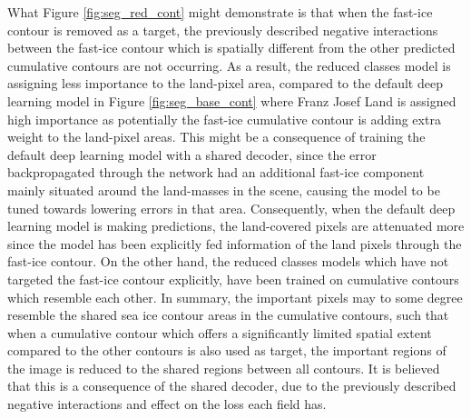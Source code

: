 \documentclass[../main/thesis]{subfiles}
\begin{document}
What Figure \ref{fig:seg_red_cont} might demonstrate is that when the fast-ice contour is removed as a target, the previously described negative interactions between the fast-ice contour which is spatially different from the other predicted cumulative contours are not occurring. As a result, the reduced classes model is assigning less importance to the land-pixel area, compared to the default deep learning model in Figure \ref{fig:seg_base_cont} where Franz Josef Land is assigned high importance as potentially the fast-ice cumulative contour is adding extra weight to the land-pixel areas. This might be a consequence of training the default deep learning model with a shared decoder, since the error backpropagated through the network had an additional fast-ice component mainly situated around the land-masses in the scene, causing the model to be tuned towards lowering errors in that area. Consequently, when the default deep learning model is making predictions, the land-covered pixels are attenuated more since the model has been explicitly fed information of the land pixels through the fast-ice contour. On the other hand, the reduced classes models which have not targeted the fast-ice contour explicitly, have been trained on cumulative contours which resemble each other. In summary, the important pixels may to some degree resemble the shared sea ice contour areas in the cumulative contours, such that when a cumulative contour which offers a significantly limited spatial extent compared to the other contours is also used as target, the important regions of the image is reduced to the shared regions between all contours. It is believed that this is a consequence of the shared decoder, due to the previously described negative interactions and effect on the loss each field has.
\end{document}
